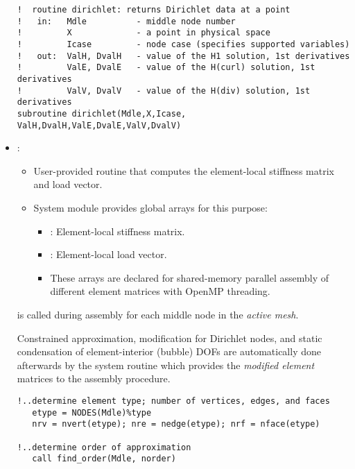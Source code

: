 \begin{itemize}
{\begin{lstlisting}[caption=\file{POISSON/GALERKIN/common/}\routine{dirichlet} routine.]
!  routine dirichlet: returns Dirichlet data at a point
!   in:   Mdle          - middle node number
!         X             - a point in physical space
!         Icase         - node case (specifies supported variables)
!   out:  ValH, DvalH   - value of the H1 solution, 1st derivatives
!         ValE, DvalE   - value of the H(curl) solution, 1st derivatives
!         ValV, DvalV   - value of the H(div) solution, 1st derivatives
subroutine dirichlet(Mdle,X,Icase, ValH,DvalH,ValE,DvalE,ValV,DvalV)
\end{lstlisting}
	}
	\item
	{:
	\begin{itemize}
	\item User-provided routine that computes the element-local stiffness matrix and load vector.
	\item System module  provides global arrays for this purpose:
	\begin{itemize}
		\item {}: Element-local stiffness matrix.
		\item {}: Element-local load vector.
		\item These arrays are declared  for shared-memory parallel assembly of different element matrices with OpenMP threading.
	\end{itemize}
\end{itemize}

 is called during assembly for each middle node  in the \emph{active mesh}.

\begin{remark}
Constrained approximation, modification for Dirichlet nodes, and static condensation of element-interior (bubble) DOFs are automatically done afterwards by the system routine  which provides the \emph{modified element} matrices to the assembly procedure.
\end{remark}

\begin{lstlisting}[mathescape,caption=\file{POISSON/GALERKIN/}\routine{elem} routine]
!..determine element type; number of vertices, edges, and faces
   etype = NODES(Mdle)%type
   nrv = nvert(etype); nre = nedge(etype); nrf = nface(etype)
   
!..determine order of approximation
   call find_order(Mdle, norder)
   

\end{lstlisting}}
\end{itemize}
